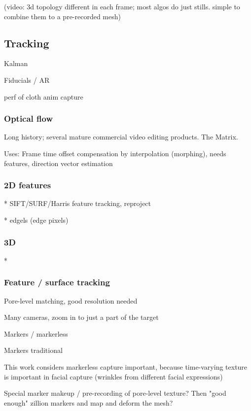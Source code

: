 (video: 3d topology different in each frame; most algos do just stills. simple to combine them to a pre-recorded mesh)


\subsection{Tracking}

Kalman

Fiducials / AR

perf of cloth anim capture
\subsubsection{Optical flow}

Long history; several mature commercial video editing products. The Matrix.

Uses: Frame time offset compensation by interpolation (morphing), needs features, direction vector estimation


\subsubsection{2D features}

* SIFT/SURF/Harris feature tracking, reproject

* edgels (edge pixels)

\subsubsection{3D}

*


\subsubsection{Feature / surface tracking}

Pore-level matching, good resolution needed

Many cameras, zoom in to just a part of the target

Markers / markerless

Markers traditional


This work considers markerless capture important, because time-varying texture is important in facial capture (wrinkles from different facial expressions)

Special marker makeup / pre-recording of pore-level texture? Then "good enough" zillion markers and map and deform the mesh?

